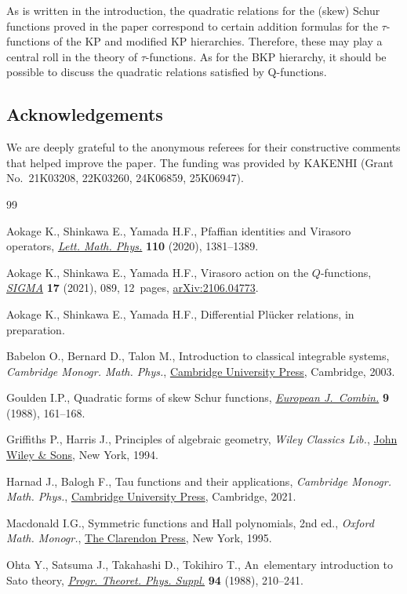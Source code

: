 \documentclass[pdftex]{sigma}
\numberwithin{equation}{section}
\begin{document}
As is written in the introduction, the quadratic relations for the (skew) Schur functions proved in the paper correspond to certain addition formulas for the $\tau$-functions of the KP and modified KP hierarchies. Therefore, these may play a central roll in the theory of $\tau$-functions. As for the BKP hierarchy, it should be possible to discuss the quadratic relations satisfied by Q-functions.

\subsection*{Acknowledgements}
We are deeply grateful to the anonymous referees for their constructive comments that helped improve the paper. The funding was provided by KAKENHI (Grant No.~21K03208, 22K03260, 24K06859, 25K06947).

\begin{thebibliography}{99}
\footnotesize\itemsep=0pt

Aokage K., Shinkawa E., Yamada H.F., Pfaffian identities and {V}irasoro
 operators, \href{https://doi.org/10.1007/s11005-020-01265-1}{\textit{Lett.
 Math. Phys.}} \textbf{110} (2020), 1381--1389.

Aokage K., Shinkawa E., Yamada H.F., Virasoro action on the {$Q$}-functions,
 \href{https://doi.org/10.3842/SIGMA.2021.089}{\textit{SIGMA}} \textbf{17}
 (2021), 089, 12~pages,
 \href{http://arxiv.org/abs/2106.04773}{arXiv:2106.04773}.

Aokage K., Shinkawa E., Yamada H.F., Differential {P}l\"ucker relations, {i}n
 preparation.

Babelon O., Bernard D., Talon M., Introduction to classical integrable systems,
 \textit{Cambridge Monogr. Math. Phys.},
 \href{https://doi.org/10.1017/CBO9780511535024}{Cambridge University Press},
 Cambridge, 2003.

Goulden I.P., Quadratic forms of skew {S}chur functions,
 \href{https://doi.org/10.1016/S0195-6698(88)80041-6}{\textit{European
 J.~Combin.}} \textbf{9} (1988), 161--168.

Griffiths P., Harris J., Principles of algebraic geometry, \textit{Wiley Classics Lib.},
 \href{https://doi.org/10.1002/9781118032527}{John Wiley \& Sons}, New
 York, 1994.

Harnad J., Balogh F., Tau functions and their applications, \textit{Cambridge Monogr.
 Math. Phys.}, \href{https://doi.org/10.1017/9781108610902}{Cambridge University Press}, Cambridge, 2021.

Macdonald I.G., Symmetric functions and {H}all polynomials, 2nd ed., \textit{Oxford Math. Monogr.}, \href{https://doi.org/10.1093/oso/9780198534891.001.0001}{The Clarendon Press}, New York, 1995.

Ohta Y., Satsuma J., Takahashi D., Tokihiro T., An~elementary introduction to
 {S}ato theory, \href{https://doi.org/10.1143/PTPS.94.210}{\textit{Progr.
 Theoret. Phys. Suppl.}} \textbf{94} (1988), 210--241.

\end{thebibliography}\LastPageEnding
\end{document}
